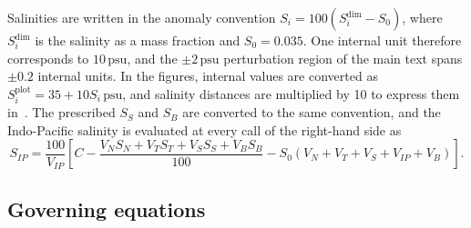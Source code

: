 \documentclass[12pt, a4paper]{article}
\newcommand{\psu}{\,\text{psu}}
\begin{document}
Salinities are written in the anomaly convention $S_i=100(S_i^{\mathrm{dim}}-S_0)$, where $S_i^{\mathrm{dim}}$ is the salinity as a mass fraction and $S_0=0.035$. One internal unit therefore corresponds to $10\psu{}$, and the $\pm2\psu{}$ perturbation region of the main text spans $\pm0.2$ internal units. In the figures, internal values are converted as $S_i^{\mathrm{plot}}=35+10S_i\psu{}$, and salinity distances are multiplied by 10 to express them in \psu{}. The prescribed $S_S$ and $S_B$ are converted to the same convention, and the Indo-Pacific salinity is evaluated at every call of the right-hand side as
\begin{equation}
S_{IP}=\frac{100}{V_{IP}}\left[C-\frac{V_NS_N+V_TS_T+V_SS_S+V_BS_B}{100}-S_0(V_N+V_T+V_S+V_{IP}+V_B)\right].
\label{eq:sip}
\end{equation}

\subsection*{Governing equations}
\end{document}
